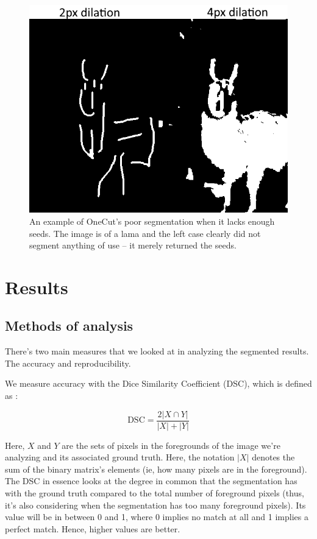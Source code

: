 \documentclass[12pt,a4paper,notitlepage]{article}
\begin{document}
\begin{figure}[h]
	\begin{center}
		\includegraphics[width=.6\linewidth]{onecut_segment_comparison}
	\end{center}
	\caption{An example of OneCut's poor segmentation when it lacks enough seeds. The image is of a lama and the left case clearly did not segment anything of use -- it merely returned the seeds.}
	\label{fig:onecut_segment_comparison}
\end{figure}

\section{Results}

\subsection{Methods of analysis}
There's two main measures that we looked at in analyzing the segmented results. The accuracy and reproducibility.

We measure accuracy with the Dice Similarity Coefficient (DSC), which is defined as \cite{dsc}:

$$\text{DSC} = \frac{2|X \cap Y|}{|X| + |Y|}$$

Here, $X$ and $Y$ are the sets of pixels in the foregrounds of the image we're analyzing and its associated ground truth. Here, the notation $|X|$ denotes the sum of the binary matrix's elements (ie, how many pixels are in the foreground). The DSC in essence looks at the degree in common that the segmentation has with the ground truth compared to the total number of foreground pixels (thus, it's also considering when the segmentation has too many foreground pixels). Its value will be in between 0 and 1, where 0 implies no match at all and 1 implies a perfect match. Hence, higher values are better.
\end{document}
